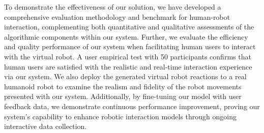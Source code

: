 


To demonstrate the effectiveness of our solution, we have developed a comprehensive evaluation methodology and benchmark for human-robot interaction, complementing both quantitative and qualitative assessments of the algorithmic components within our system.
Further, we evaluate the efficiency and quality performance of our system when facilitating human users to interact with the virtual robot. 
A user empirical test with 50 participants confirms that human users are satisfied with the realistic and real-time interaction experience via our system. We also deploy the generated virtual robot reactions to a real humanoid robot to examine the realism and fidelity of the robot movements presented with our system. Additionally, by fine-tuning our model with user feedback data, we demonstrate continuous performance improvement, proving our system's capability to enhance robotic interaction models through ongoing interactive data collection. 

